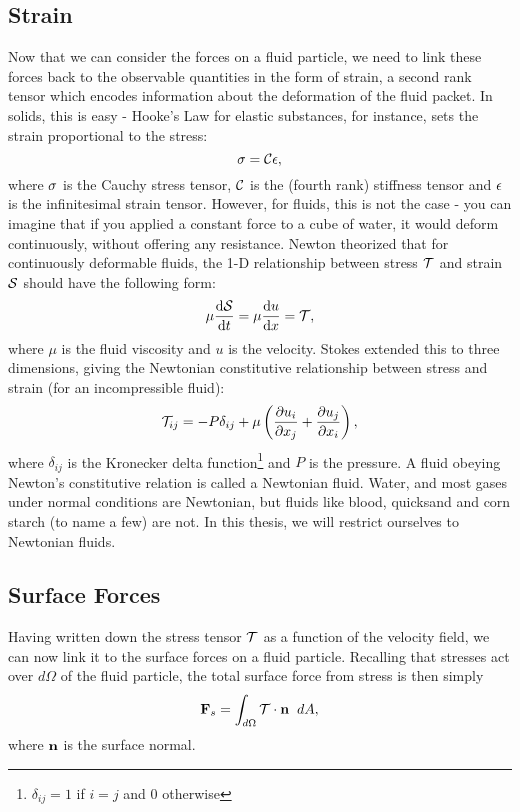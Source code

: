 \subsection{Strain}
Now that we can consider the forces on a fluid particle, we need to link these forces back to the observable quantities in the form of strain, a second rank tensor which encodes information about the deformation of the fluid packet. In solids, this is easy - Hooke's Law for elastic substances, for instance, sets the strain proportional to the stress:
\begin{equation}
\mathbf{\sigma} = \mathcal{C}\mathbf{\epsilon},
\end{equation}
where $\mathbf{\sigma}$ is the Cauchy stress tensor, $\mathcal{C}$ is the (fourth rank) stiffness tensor and $\mathbf{\epsilon}$ is the infinitesimal strain tensor. However, for fluids, this is not the case - you can imagine that if you applied a constant force to a cube of water, it would deform continuously, without offering any resistance. Newton theorized that for continuously deformable fluids, the 1-D relationship between stress $\mathcal{T}$ and strain $\mathcal{S}$ should have the following form:
\begin{equation}
\mu \der{1}{\Tensor{S}}{t} = \mu \der{1}{u}{x}=\Tensor{T}, 
\end{equation}
where $\mu$ is the fluid viscosity and $u$ is the velocity.  Stokes extended this to three dimensions, giving the Newtonian constitutive relationship between stress and strain (for an incompressible fluid):
\begin{equation}\label{eq:constitutive}
\Tensor{T}_{ij} = -P\delta_{ij} + \mu\paren{\pder{1}{u_{i}}{x_j} + \pder{1}{u_j}{x_i}},
\end{equation}
where $\delta_{ij}$ is the Kronecker delta function\footnote{$\delta_{ij} = 1$ if $i=j$ and $0$ otherwise} and $P$ is the pressure. A fluid obeying Newton's constitutive relation is called a Newtonian fluid. Water, and most gases under normal conditions are Newtonian, but fluids like blood, quicksand and corn starch (to name a few) are not. In this thesis, we will restrict ourselves to Newtonian fluids.

\subsection{Surface Forces}
Having written down the stress tensor $\mathcal{T}$ as a function of the velocity field, we can now link it to the surface forces on a fluid particle. Recalling that stresses act over $d\Omega$ of the fluid particle, the total surface force from stress is then simply 
\begin{equation}\label{eq:surfaceForce}
\Vector{F}_s = \int{d\Omega}{}{\Tensor{T}\cdot\Vector{n}}{dA},
\end{equation}
where $\mathbf{n}$ is the surface normal. 
